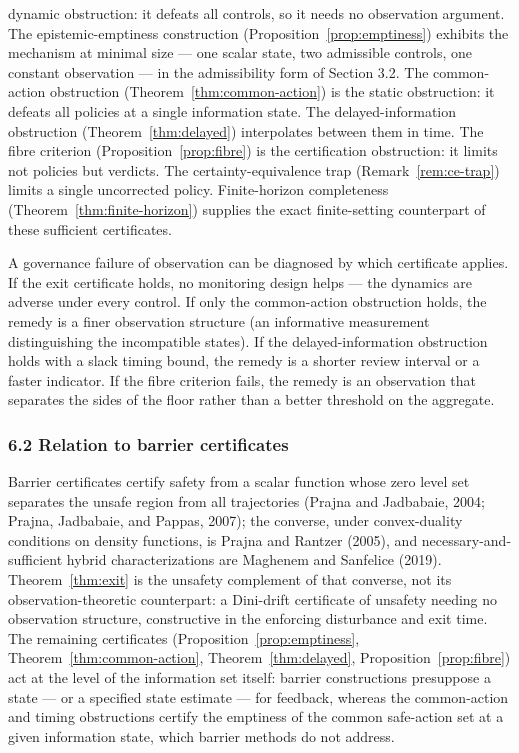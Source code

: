 \documentclass[10pt,twocolumn]{article}
\theoremstyle{definition}
\begin{document}
dynamic obstruction: it defeats all controls, so it needs no observation
argument. The epistemic-emptiness construction (Proposition~\ref{prop:emptiness}) exhibits the
mechanism at minimal size --- one scalar state, two admissible controls,
one constant observation --- in the admissibility form of Section 3.2. The common-action obstruction (Theorem~\ref{thm:common-action}) is the static
obstruction: it defeats all policies at a single information state. The
delayed-information obstruction (Theorem~\ref{thm:delayed}) interpolates between them in
time. The fibre criterion (Proposition~\ref{prop:fibre}) is the certification obstruction:
it limits not policies but verdicts. The certainty-equivalence trap
(Remark~\ref{rem:ce-trap}) limits a single uncorrected policy. Finite-horizon completeness
(Theorem~\ref{thm:finite-horizon}) supplies the exact finite-setting
counterpart of these sufficient certificates.

A governance failure of observation can be diagnosed by which
certificate applies. If the exit certificate holds, no monitoring design
helps --- the dynamics are adverse under every control. If only the
common-action obstruction holds, the remedy is a finer observation
structure (an informative measurement distinguishing the incompatible
states). If the delayed-information obstruction holds with a slack
timing bound, the remedy is a shorter review interval or a faster
indicator. If the fibre criterion fails, the remedy is an observation
that separates the sides of the floor rather than a better threshold on
the aggregate.

\subsubsection{6.2 Relation to barrier
certificates}\label{relation-to-barrier-certificates}

Barrier certificates certify safety from a scalar function whose zero level set separates the unsafe region from all trajectories (Prajna and Jadbabaie, 2004; Prajna, Jadbabaie, and Pappas, 2007); the converse, under convex-duality conditions on density functions, is Prajna and Rantzer (2005), and necessary-and-sufficient hybrid characterizations are Maghenem and Sanfelice (2019). Theorem~\ref{thm:exit} is the unsafety complement of that converse, not its observation-theoretic counterpart: a Dini-drift certificate of unsafety needing no observation structure, constructive in the enforcing disturbance and exit time. The remaining certificates (Proposition~\ref{prop:emptiness}, Theorem~\ref{thm:common-action}, Theorem~\ref{thm:delayed}, Proposition~\ref{prop:fibre}) act at the level of the information set itself: barrier constructions presuppose a state --- or a specified state estimate --- for feedback, whereas the common-action and timing obstructions certify the emptiness of the common safe-action set at a given information state, which barrier methods do not address.
\end{document}
